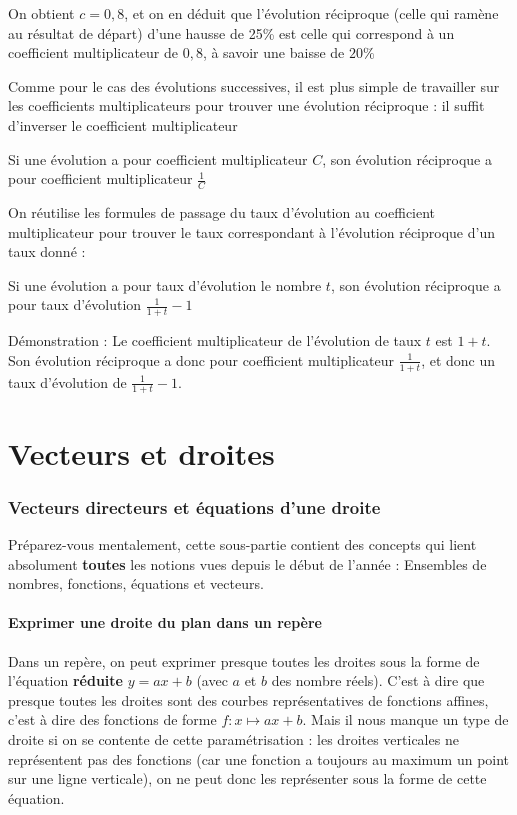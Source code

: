 \documentclass[10pt,a4paper,oneside]{book}
\begin{document}
On obtient $c=0{,}8$, et on en déduit que l'évolution réciproque (celle qui ramène au résultat de départ) d'une hausse de 25\% est celle qui correspond à un coefficient multiplicateur de $0{,}8$, à savoir une baisse de $20\%$ 

Comme pour le cas des évolutions successives, il est plus simple de travailler sur les coefficients multiplicateurs pour trouver une évolution réciproque : il suffit d'inverser le coefficient multiplicateur


\begin{prop}
  Si une évolution a pour coefficient multiplicateur $C$, son évolution réciproque a pour coefficient multiplicateur $\frac{1}{C}$
\end{prop}

On réutilise les formules de passage du taux d'évolution au coefficient multiplicateur pour trouver le taux correspondant à l'évolution réciproque d'un taux donné :

\begin{prop}
  Si une évolution a pour taux d'évolution le nombre $t$, son évolution réciproque a pour taux d'évolution $\frac{1}{1+t} - 1$
\end{prop}

Démonstration : Le coefficient multiplicateur de l'évolution de taux $t$ est $1+t$. 
Son évolution réciproque a donc pour coefficient multiplicateur $\frac{1}{1+t}$, et donc un taux d'évolution de $\frac{1}{1+t}-1$.




\chapter{Vecteurs et droites}

\subsection{Vecteurs directeurs et équations d'une droite}

Préparez-vous mentalement, cette sous-partie contient des concepts qui lient absolument \textbf{toutes} les notions vues depuis le début de l'année : Ensembles de nombres, fonctions, équations et vecteurs.

\subsubsection{Exprimer une droite du plan dans un repère}

Dans un repère, on peut exprimer presque toutes les droites sous la forme de l'équation \textbf{réduite} $y=ax+b$ (avec $a$ et $b$ des nombre réels). C'est à dire que presque toutes les droites sont des courbes représentatives de fonctions affines, c'est à dire des fonctions de forme $f : x \mapsto ax+b$. 
Mais il nous manque un type de droite si on se contente de cette paramétrisation : les droites verticales ne représentent pas des fonctions (car une fonction a toujours au maximum un point sur une ligne verticale), on ne peut donc les représenter sous la forme de cette équation.
\end{document}
